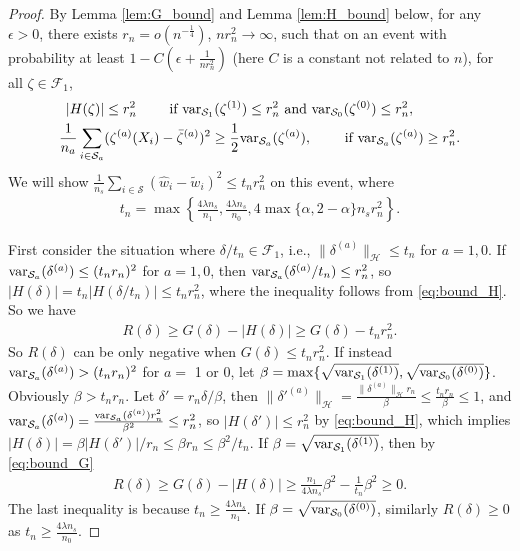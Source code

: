 \documentclass[12pt]{article}
\newcommand{\var}{\textnormal{var}}
\begin{document}
\begin{proof}
	
	By Lemma \ref{lem:G_bound} and Lemma \ref{lem:H_bound} below, for any $\epsilon > 0$, there exists $r_n = o(n^{-\frac{1}{4}})$, $n r_n^2 \rightarrow \infty$, such that on an event with probability at least $1 - C(\epsilon + \frac{1}{n r_n^2})$ (here $C$ is a constant not related to $n$), for all $\zeta \in \mathcal{F}_1$,
	\begin{align}
		|H(\zeta)| &\le r_n^2
		\hspace{2em}
		\text{ if }
		\var_{\mathcal{S}_1}(\zeta^{(1)}) \le r_n^2
		\textnormal{ and }
		\var_{\mathcal{S}_0}(\zeta^{(0)}) \le r_n^2,
		\label{eq:bound_H}
		\\
		\frac{1}{n_a} \sum_{i \in \mathcal{S}_a} &(\zeta^{(a)}(X_i) - \bar{\zeta}^{(a)})^2
		\ge \frac{1}{2} \var_{\mathcal{S}_a}(\zeta^{(a)}),
		\hspace{2em}\text{ if }
		\var_{\mathcal{S}_a}(\zeta^{(a)}) \ge r_n^2
		\label{eq:bound_G}
		.\end{align}
	We will show $\frac{1}{n_s} \sum_{i \in \mathcal{S}} (\hat{w}_i - \tilde{w}_i)^2 \le t_n r_n^2$ on this event, where
	\begin{align*}
		t_n = \max\left\{
		\frac{4\lambda n_s}{n_1},
		\frac{4\lambda n_s}{n_0},
		4 \max\{\alpha, 2-\alpha\} n_s r_n^2
		\right\}
		.\end{align*}
	
	First consider the situation where $\delta / t_n \in \mathcal{F}_1$, i.e., $\| \delta^{(a)} \|_\mathcal{H} \le t_n$ for $a = 1, 0$.
	If $\var_{\mathcal{S}_a}(\delta^{(a)}) \le (t_n r_n)^2$ for $a = 1, 0$, then $\var_{\mathcal{S}_a}(\delta^{(a)} / t_n) \le r_n^2$, so $|H(\delta)| = t_n|H(\delta / t_n)| \le t_n r_n^2$, where the inequality follows from \eqref{eq:bound_H}. So we have
	\begin{align*}
		R(\delta)
		\ge G(\delta) - |H(\delta)|
		\ge G(\delta) - t_n r_n^2
		.\end{align*}
	So $R(\delta)$ can be only negative when $G(\delta) \le t_n r_n^2$.
	If instead $\var_{\mathcal{S}_a}(\delta^{(a)}) > (t_n r_n)^2$ for $a = $ 1 or 0, let $\beta = \max\{\sqrt{\var_{\mathcal{S}_1}(\delta^{(1)})}, \sqrt{\var_{\mathcal{S}_0}(\delta^{(0)})}\}$. Obviously $\beta > t_n r_n$. 
	Let $\delta' = r_n \delta / \beta$, then 
	$\| \delta'^{(a)} \|_\mathcal{H} = \frac{\| \delta^{(a)}\|_\mathcal{H} r_n}{\beta} \le \frac{t_n r_n}{\beta} \le 1$, and $\var_{\mathcal{S}_a}(\delta^{(a)}) = \frac{\var_{\mathcal{S}_a}(\delta^{(a)}) r_n^2}{\beta^2} \le r_n^2 $, so $|H(\delta')| \le r_n^2$ by \eqref{eq:bound_H}, which implies $|H(\delta)| = \beta |H(\delta')| / r_n \le \beta r_n \le \beta^2 / t_n$. If $\beta = \sqrt{\var_{\mathcal{S}_1}(\delta^{(1)})}$, then by \eqref{eq:bound_G}
	\begin{align*}
		R(\delta)
		\ge G(\delta) - |H(\delta)|
		\ge \frac{n_1}{4\lambda n_s} \beta^2 - \frac{1}{t_n} \beta^2
		\ge 0
		.\end{align*}
	The last inequality is because $t_n \ge \frac{4\lambda n_s}{n_1}$. If $\beta = \sqrt{\var_{\mathcal{S}_0}(\delta^{(0)})}$, similarly $R(\delta) \ge 0$ as $t_n \ge \frac{4\lambda n_s}{n_0}$.
	

\end{proof}
\end{document}
